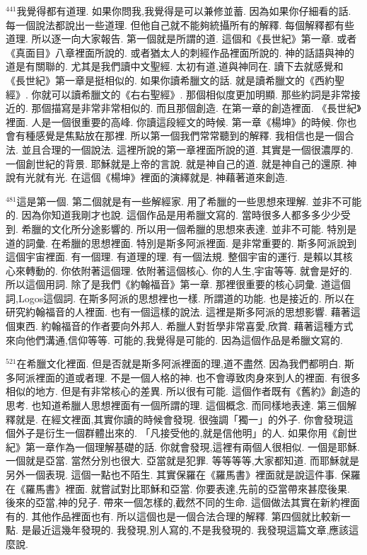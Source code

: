 \documentclass{book}
\begin{document}
$^{441}$我覺得都有道理.
如果你問我,我覺得是可以兼修並蓄.
因為如果你仔細看的話.
每一個說法都說出一些道理.
但他自己就不能夠統攝所有的解釋.
每個解釋都有些道理.
所以逐一向大家報告.
第一個就是所謂的道.
這個和《長世紀》第一章.
或者《真面目》八章裡面所說的.
或者猶太人的刺經作品裡面所說的.
神的話語與神的道是有關聯的.
尤其是我們讀中文聖經.
太初有道,道與神同在.
讀下去就感覺和《長世紀》第一章是挺相似的.
如果你讀希臘文的話.
就是讀希臘文的《西約聖經》.
你就可以讀希臘文的《右右聖經》.
那個相似度更加明顯.
那些約詞是非常接近的.
那個描寫是非常非常相似的.
而且那個創造.
在第一章的創造裡面.
《長世紀》裡面.
人是一個很重要的高峰.
你讀這段經文的時候.
第一章《楊坤》的時候.
你也會有種感覺是焦點放在那裡.
所以第一個我們常常聽到的解釋.
我相信也是一個合法.
並且合理的一個說法.
這裡所說的第一章裡面所說的道.
其實是一個很濃厚的.
一個創世紀的背景.
耶穌就是上帝的言說.
就是神自己的道.
就是神自己的還原.
神說有光就有光.
在這個《楊坤》裡面的演繹就是.
神藉著道來創造.

$^{481}$這是第一個.
第二個就是有一些解經家.
用了希臘的一些思想來理解.
並非不可能的.
因為你知道我剛才也說.
這個作品是用希臘文寫的.
當時很多人都多多少少受到.
希臘的文化所分途影響的.
所以用一個希臘的思想來表達.
並非不可能.
特別是道的詞彙.
在希臘的思想裡面.
特別是斯多阿派裡面.
是非常重要的.
斯多阿派說到這個宇宙裡面.
有一個理.
有道理的理.
有一個法規.
整個宇宙的運行.
是賴以其核心來轉動的.
你依附著這個理.
依附著這個核心.
你的人生,宇宙等等.
就會是好的.
所以這個用詞.
除了是我們《約翰福音》第一章.
那裡很重要的核心詞彙.
道這個詞,Logos這個詞.
在斯多阿派的思想裡也一樣.
所謂道的功能.
也是接近的.
所以在研究約翰福音的人裡面.
也有一個這樣的說法.
這裡是斯多阿派的思想影響.
藉著這個東西.
約翰福音的作者要向外邦人.
希臘人對哲學非常喜愛,欣賞.
藉著這種方式來向他們溝通,信仰等等.
可能的,我覺得是可能的.
因為這個作品是希臘文寫的.

$^{521}$在希臘文化裡面.
但是否就是斯多阿派裡面的理,道不盡然.
因為我們都明白.
斯多阿派裡面的道或者理.
不是一個人格的神.
也不會導致肉身來到人的裡面.
有很多相似的地方.
但是有非常核心的差異.
所以很有可能.
這個作者既有《舊約》創造的思考.
也知道希臘人思想裡面有一個所謂的理.
這個概念.
而同樣地表達.
第三個解釋就是.
在經文裡面,其實你讀的時候會發現.
很強調「獨一」的外子.
你會發現這個外子是衍生一個群體出來的.
「凡接受他的,就是信他明」的人.
如果你用《創世紀》第一章作為一個理解基礎的話.
你就會發現,這裡有兩個人很相似.
一個是耶穌.
一個就是亞當.
當然分別也很大.
亞當就是犯罪.
等等等等,大家都知道.
而耶穌就是另外一個表現.
這個一點也不陌生.
其實保羅在《羅馬書》裡面就是說這件事.
保羅在《羅馬書》裡面.
就嘗試對比耶穌和亞當.
你要表達,先前的亞當帶來甚麼後果.
後來的亞當,神的兒子.
帶來一個怎樣的,截然不同的生命.
這個做法其實在新約裡面有的.
其他作品裡面也有.
所以這個也是一個合法合理的解釋.
第四個就比較新一點.
是最近這幾年發現的.
我發現,別人寫的,不是我發現的.
我發現這篇文章,應該這麼說.
\end{document}
